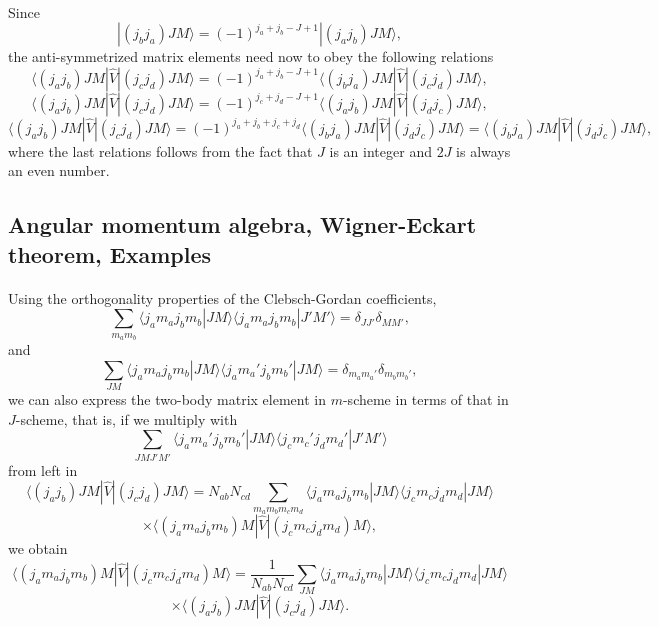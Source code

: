 \documentclass[%
twoside,                 %
final,                   %
10pt]{article}
\begin{document}
\paragraph{}
Since
\[
|(j_bj_a)JM\rangle=(-1)^{j_a+j_b-J+1}|(j_aj_b)JM\rangle,
\]
the anti-symmetrized matrix elements need now to obey the following relations
\[
\langle (j_aj_b) JM | \hat{V} | (j_cj_d) JM \rangle = (-1)^{j_a+j_b-J+1}\langle (j_bj_a) JM | \hat{V} | (j_cj_d) JM \rangle,
\]
\[
\langle (j_aj_b) JM | \hat{V} | (j_cj_d) JM \rangle = (-1)^{j_c+j_d-J+1}\langle (j_aj_b) JM | \hat{V} | (j_dj_c) JM \rangle,
\]
\[
\langle (j_aj_b) JM | \hat{V} | (j_cj_d) JM \rangle = (-1)^{j_a+j_b+j_c+j_d}\langle (j_bj_a) JM | \hat{V} | (j_dj_c) JM \rangle=\langle (j_bj_a) JM | \hat{V} | (j_dj_c) JM \rangle,
\]
where the last relations follows from the fact that $J$ is an integer and $2J$ is always an even number.



\subsection*{Angular momentum algebra, Wigner-Eckart theorem, Examples}

\paragraph{}
Using the orthogonality properties of the Clebsch-Gordan coefficients,
\[
\sum_{m_am_b}\langle j_am_aj_bm_b|JM\rangle\langle j_am_aj_bm_b|J'M'\rangle=\delta_{JJ'}\delta_{MM'},
\]
and
\[
\sum_{JM}\langle j_am_aj_bm_b|JM\rangle\langle j_am_a'j_bm_b'|JM\rangle=\delta_{m_am_a'}\delta_{m_bm_b'},
\]
we can also express the two-body matrix element in $m$-scheme in terms of that in $J$-scheme, that is, if we multiply with 
\[
\sum_{JMJ'M'}\langle j_am_a'j_bm_b'|JM\rangle\langle j_cm_c'j_dm_d'|J'M'\rangle
\]
from left in
\[
\langle (j_aj_b) JM | \hat{V} | (j_cj_d) JM \rangle = N_{ab}N_{cd}\sum_{m_am_bm_cm_d}\langle j_am_aj_bm_b|JM\rangle\langle j_cm_cj_dm_d|JM\rangle
\]
\[
\times \langle (j_am_aj_bm_b)M|  \hat{V} | (j_cm_cj_dm_d)M\rangle,
\]
we obtain
\[
\langle (j_am_aj_bm_b)M |  \hat{V} | (j_cm_cj_dm_d)M\rangle=\frac{1}{N_{ab}N_{cd}}\sum_{JM}\langle j_am_aj_bm_b|JM\rangle\langle j_cm_cj_dm_d|JM\rangle
\]
\[
\times \langle (j_aj_b) JM | \hat{V} | (j_cj_d) JM \rangle.
\]




\end{document}

